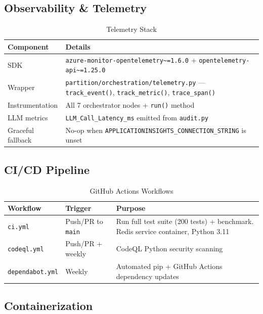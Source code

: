 \documentclass[11pt,a4paper]{article}
\begin{document}
\subsection{Observability \& Telemetry}

\begin{table}[H]
\centering
\caption{Telemetry Stack}
\renewcommand{\arraystretch}{1.3}
\small
\begin{tabularx}{\textwidth}{@{} l X @{}}
\toprule
\textbf{Component} & \textbf{Details} \\
\midrule
SDK & \texttt{azure-monitor-opentelemetry\textasciitilde=1.6.0} + \texttt{opentelemetry-api\textasciitilde=1.25.0} \\
Wrapper & \texttt{partition/orchestration/telemetry.py} — \texttt{track\_event()}, \texttt{track\_metric()}, \texttt{trace\_span()} \\
Instrumentation & All 7 orchestrator nodes + \texttt{run()} method \\
LLM metrics & \texttt{LLM\_Call\_Latency\_ms} emitted from \texttt{audit.py} \\
Graceful fallback & No-op when \texttt{APPLICATIONINSIGHTS\_CONNECTION\_STRING} is unset \\
\bottomrule
\end{tabularx}
\end{table}

\subsection{CI/CD Pipeline}

\begin{table}[H]
\centering
\caption{GitHub Actions Workflows}
\renewcommand{\arraystretch}{1.3}
\small
\begin{tabularx}{\textwidth}{@{} l l X @{}}
\toprule
\textbf{Workflow} & \textbf{Trigger} & \textbf{Purpose} \\
\midrule
\texttt{ci.yml} & Push/PR to \texttt{main} & Run full test suite (200 tests) + benchmark. Redis service container, Python 3.11 \\
\texttt{codeql.yml} & Push/PR + weekly & CodeQL Python security scanning \\
\texttt{dependabot.yml} & Weekly & Automated pip + GitHub Actions dependency updates \\
\bottomrule
\end{tabularx}
\end{table}

\subsection{Containerization}
\end{document}
